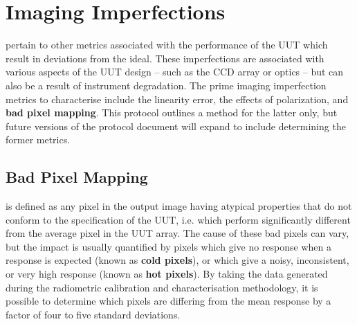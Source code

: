 \documentclass[nohyper,nobib]{tufte-book}
\begin{document}
\chapter{Imaging Imperfections}
\label{ch:imagingimp}
 pertain to other metrics associated with the performance of the UUT which result in deviations from the ideal. These imperfections are associated with various aspects of the UUT design -- such as the CCD array or optics -- but can also be a result of instrument degradation. The prime imaging imperfection metrics to characterise include the linearity error, the effects of polarization, and \textbf{bad pixel mapping}. This protocol outlines a method for the latter only, but future versions of the protocol document will expand to include determining the former metrics. 

\section{Bad Pixel Mapping}
 is defined as any pixel in the output image having atypical properties that do not conform to the specification of the UUT, i.e. which perform significantly different from the average pixel in the UUT array. The cause of these bad pixels can vary, but the impact is usually quantified by pixels which give no response when a response is expected (known as \textbf{cold pixels}),  or which give a noisy, inconsistent, or very high response (known as \textbf{hot pixels}). By taking the data generated during the radiometric calibration and characterisation methodology, it is possible to determine which pixels are differing from the mean response by a factor of four to five standard deviations. 
\end{document}
